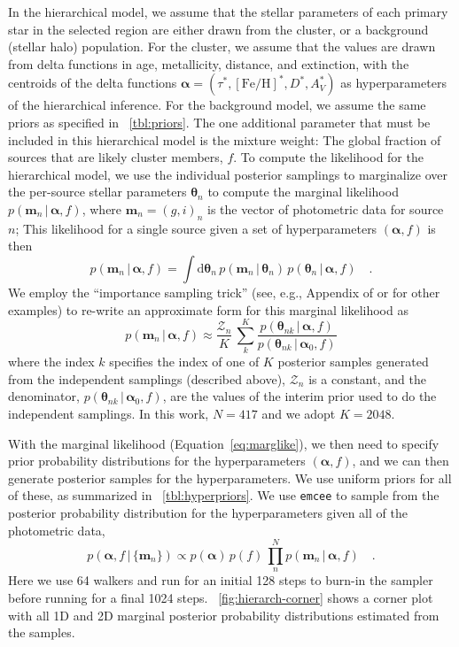 \documentclass[twocolumn]{aastex62}
\newcommand{\bs}[1]{\boldsymbol{#1}}
\newcommand{\equationname}{Equation}
\newcommand{\given}{\,|\,}
\newcommand{\dd}{\mathrm{d}}
\newcommand{\feh}{\ensuremath{[\textrm{Fe} / \textrm{H}]}}
\newcommand{\Nisofit}{417}
\begin{document}
In the hierarchical model, we assume that the stellar parameters of each primary star in the selected region are either drawn from the cluster, or a background (stellar halo) population.
For the cluster, we assume that the values are drawn from delta functions in age, metallicity, distance, and extinction, with the centroids of the delta functions $\bs{\alpha} = (\tau^*, \feh^*, D^*, A_V^*)$ as hyperparameters of the hierarchical inference.
For the background model, we assume the same priors as specified in \tablename~\ref{tbl:priors}.
The one additional parameter that must be included in this hierarchical model is the mixture weight: The global fraction of sources that are likely cluster members, $f$.
To compute the likelihood for the hierarchical model, we use the individual posterior samplings to marginalize over the per-source stellar parameters $\bs{\theta}_n$ to compute the marginal likelihood $p(\bs{m}_n \given \bs{\alpha}, f)$, where $\bs{m}_n = (g, i)_n$ is the vector of photometric data for source $n$;
This likelihood for a single source given a set of hyperparameters $(\bs{\alpha}, f)$ is then
\begin{equation}
    p(\bs{m}_n \given \bs{\alpha}, f) = \int \dd \bs{\theta}_n \,
        p(\bs{m}_n \given \bs{\theta}_n) \,
        p(\bs{\theta}_n \given \bs{\alpha}, f) \quad .
\end{equation}
We employ the ``importance sampling trick'' (see, e.g., Appendix of \citealt{Price-Whelan:2018} or \citealt{Hogg:2010, Foreman-Mackey:2014} for other examples) to re-write an approximate form for this marginal likelihood as
\begin{equation}
    p(\bs{m}_n \given \bs{\alpha}, f) \approx \frac{\mathcal{Z}_n}{K} \,
        \sum_k^K \frac{p(\bs{\theta}_{nk} \given \bs{\alpha}, f)}{p(\bs{\theta}_{nk} \given \bs{\alpha}_0, f)}
        \label{eq:marglike}
\end{equation}
where the index $k$ specifies the index of one of $K$ posterior samples generated from the independent samplings (described above), $\mathcal{Z}_n$ is a constant, and the denominator, $p(\bs{\theta}_{nk} \given \bs{\alpha}_0, f)$, are the values of the interim prior used to do the independent samplings.
In this work, $N=\Nisofit$ and we adopt $K=2048$.

With the marginal likelihood (\equationname~\ref{eq:marglike}), we then need to specify prior probability distributions for the hyperparameters $(\bs{\alpha}, f)$, and we can then generate posterior samples for the hyperparameters.
We use uniform priors for all of these, as summarized in \tablename~\ref{tbl:hyperpriors}.
We use \texttt{emcee} \citep{emcee, Goodman:2010} to sample from the posterior probability distribution for the hyperparameters given all of the photometric data,
\begin{equation}
    p(\bs{\alpha}, f \given \{\bs{m}_n\}) \propto
        p(\bs{\alpha}) \, p(f) \,
        \prod_n^N p(\bs{m}_n \given \bs{\alpha}, f) \quad .
\end{equation}
Here we use 64 walkers and run for an initial 128 steps to burn-in the sampler before running for a final 1024 steps.
\figurename~\ref{fig:hierarch-corner} shows a corner plot with all 1D and 2D marginal posterior probability distributions estimated from the samples.
\end{document}
